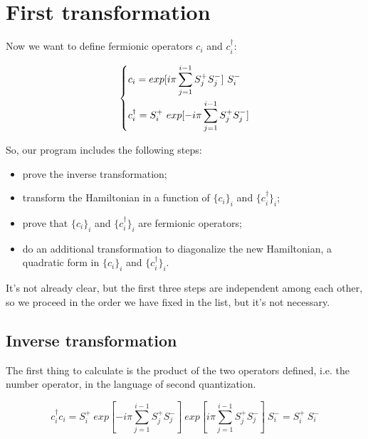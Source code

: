 
\section{First transformation}
\label{sec:first}


Now we want to define fermionic operators $c_i$ and $c_i^\dagger$:

\begin{equation}
\begin{dcases}
c_i = exp[i\pi \sum_{j=1}^{i-1} S_j^+ S_j^-]~S_i^-\\
c_i^\dagger = S_i^+~exp[-i\pi \sum_{j=1}^{i-1} S_j^+ S_j^-]
\end{dcases}
\label{coperators}
\end{equation}

So, our program includes the following steps:
\begin{itemize}
	\item prove the inverse transformation;
	\item transform the Hamiltonian in a function of $\{c_i\}_i$ and $\{c_i^\dagger\}_i$;
	\item prove that $\{c_i\}_i$ and $\{c_i^\dagger\}_i$ are fermionic operators;
	\item do an additional transformation to diagonalize the new Hamiltonian, a quadratic form in $\{c_i\}_i$ and $\{c_i^\dagger\}_i$.
\end{itemize}

It's not already clear, but the first three steps are independent among each other, so we proceed in the order we have fixed in the list, but it's not necessary.

\subsection{Inverse transformation}

The first thing to calculate is the product of the two operators defined, i.e. the number operator, in the language of second quantization.

\begin{equation*}
c_i^\dagger c_i = S_i^+~exp[-i\pi \sum_{j=1}^{i-1} S_j^+ S_j^-]~exp[i\pi \sum_{j=1}^{i-1} S_j^+ S_j^-]~S_i^- = S_i^+~S_i^-
\end{equation*}

